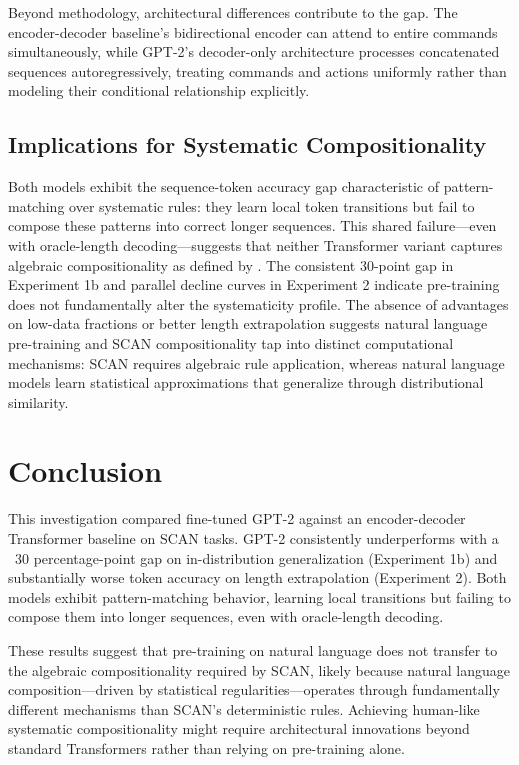 \documentclass[11pt]{article}
\begin{document}
Beyond methodology, architectural differences contribute to the gap. The encoder-decoder baseline's bidirectional encoder can attend to entire commands simultaneously, while GPT-2's decoder-only architecture processes concatenated sequences autoregressively, treating commands and actions uniformly rather than modeling their conditional relationship explicitly.

\subsection{Implications for Systematic Compositionality}

Both models exhibit the sequence-token accuracy gap characteristic of pattern-matching over systematic rules: they learn local token transitions but fail to compose these patterns into correct longer sequences. This shared failure---even with oracle-length decoding---suggests that neither Transformer variant captures algebraic compositionality as defined by \citet{Fodor:88}. The consistent 30-point gap in Experiment 1b and parallel decline curves in Experiment 2 indicate pre-training does not fundamentally alter the systematicity profile. The absence of advantages on low-data fractions or better length extrapolation suggests natural language pre-training and SCAN compositionality tap into distinct computational mechanisms: SCAN requires algebraic rule application, whereas natural language models learn statistical approximations that generalize through distributional similarity.

\section{Conclusion}

This investigation compared fine-tuned GPT-2 against an encoder-decoder Transformer baseline on SCAN tasks. GPT-2 consistently underperforms with a ~30 percentage-point gap on in-distribution generalization (Experiment 1b) and substantially worse token accuracy on length extrapolation (Experiment 2). Both models exhibit pattern-matching behavior, learning local transitions but failing to compose them into longer sequences, even with oracle-length decoding.

These results suggest that pre-training on natural language does not transfer to the algebraic compositionality required by SCAN, likely because natural language composition---driven by statistical regularities---operates through fundamentally different mechanisms than SCAN's deterministic rules. Achieving human-like systematic compositionality might require architectural innovations beyond standard Transformers rather than relying on pre-training alone.


\end{document}
